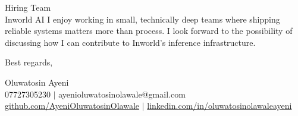 \documentclass[12pt]{letter}
\begin{document}
\begin{letter}{Hiring Team \\ Inworld AI}
I enjoy working in small, technically deep teams where shipping reliable systems matters more than process.
I look forward to the possibility of discussing how I can contribute to Inworld's inference infrastructure.

\closing{Best regards,}

\vspace{1em}
Oluwatosin Ayeni \\
07727305230 $|$ ayenioluwatosinolawale@gmail.com \\
\href{https://github.com/AyeniOluwatosinOlawale}{github.com/AyeniOluwatosinOlawale} $|$
\href{https://www.linkedin.com/in/oluwatosinolawaleayeni/}{linkedin.com/in/oluwatosinolawaleayeni}

\end{letter}
\end{document}
